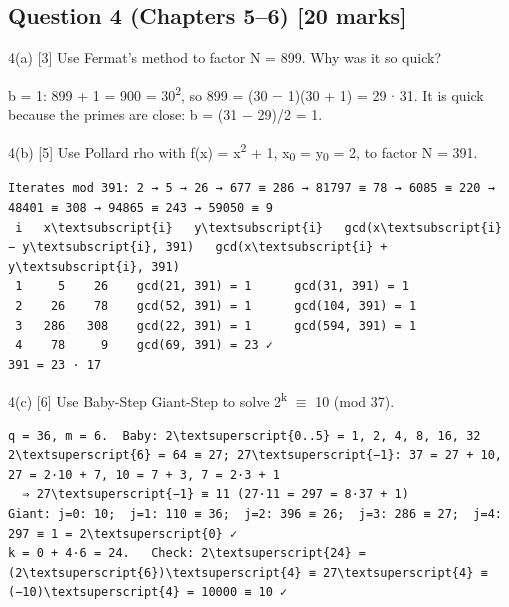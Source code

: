 \documentclass[11pt,a4paper]{article}
\begin{document}
\subsection*{Question 4 (Chapters 5–6) [20 marks]}
\begin{question}{4(a) \hfill\textnormal{\small [3]}}
Use Fermat's method to factor N = 899. Why was it so quick?\par
\end{question}
\begin{answer}
b = 1: 899 + 1 = 900 = 30\textsuperscript{2}, so 899 = (30 \ensuremath{-} 1)(30 + 1) = 29 \ensuremath{\cdot} 31. It is quick because the primes are close: b = (31 \ensuremath{-} 29)/2 = 1.\par
\end{answer}
\begin{question}{4(b) \hfill\textnormal{\small [5]}}
Use Pollard rho with f(x) = x\textsuperscript{2} + 1, x\textsubscript{0} = y\textsubscript{0} = 2, to factor N = 391.\par
\end{question}
\begin{answer}
\begin{workbox}
\begin{Verbatim}[commandchars=\\\{\},fontsize=\tiny]
Iterates mod 391: 2 → 5 → 26 → 677 ≡ 286 → 81797 ≡ 78 → 6085 ≡ 220 → 48401 ≡ 308 → 94865 ≡ 243 → 59050 ≡ 9
 i   x\textsubscript{i}   y\textsubscript{i}   gcd(x\textsubscript{i} − y\textsubscript{i}, 391)   gcd(x\textsubscript{i} + y\textsubscript{i}, 391)
 1     5    26    gcd(21, 391) = 1      gcd(31, 391) = 1
 2    26    78    gcd(52, 391) = 1      gcd(104, 391) = 1
 3   286   308    gcd(22, 391) = 1      gcd(594, 391) = 1
 4    78     9    gcd(69, 391) = 23 ✓
391 = 23 · 17
\end{Verbatim}
\end{workbox}
\end{answer}
\begin{question}{4(c) \hfill\textnormal{\small [6]}}
Use Baby-Step Giant-Step to solve 2\textsuperscript{k} \ensuremath{\equiv} 10 (mod 37).\par
\end{question}
\begin{answer}
\begin{workbox}
\begin{Verbatim}[commandchars=\\\{\},fontsize=\footnotesize]
q = 36, m = 6.  Baby: 2\textsuperscript{0..5} = 1, 2, 4, 8, 16, 32
2\textsuperscript{6} = 64 ≡ 27; 27\textsuperscript{−1}: 37 = 27 + 10, 27 = 2·10 + 7, 10 = 7 + 3, 7 = 2·3 + 1
  ⇒ 27\textsuperscript{−1} ≡ 11 (27·11 = 297 = 8·37 + 1)
Giant: j=0: 10;  j=1: 110 ≡ 36;  j=2: 396 ≡ 26;  j=3: 286 ≡ 27;  j=4: 297 ≡ 1 = 2\textsuperscript{0} ✓
k = 0 + 4·6 = 24.   Check: 2\textsuperscript{24} = (2\textsuperscript{6})\textsuperscript{4} ≡ 27\textsuperscript{4} ≡ (−10)\textsuperscript{4} = 10000 ≡ 10 ✓
\end{Verbatim}
\end{workbox}
\end{answer}
\end{document}
